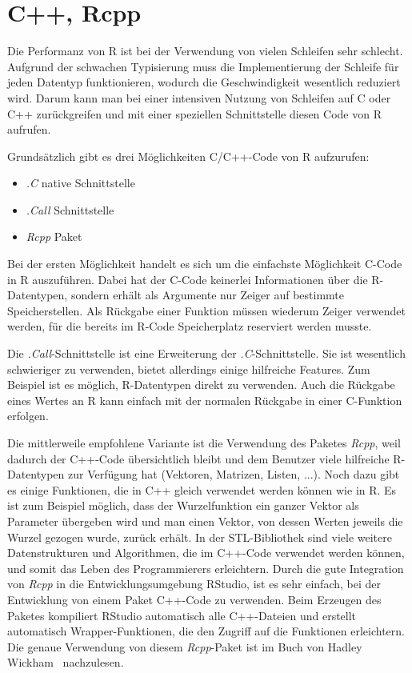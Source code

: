 \section{C++, Rcpp}
\label{sec:Rcpp}
Die Performanz von R ist bei der Verwendung von vielen Schleifen sehr schlecht. Aufgrund der schwachen Typisierung muss die Implementierung der Schleife für jeden Datentyp funktionieren, wodurch die Geschwindigkeit wesentlich reduziert wird. Darum kann man bei einer intensiven Nutzung von Schleifen auf C oder C++ zurückgreifen und mit einer speziellen Schnittstelle diesen Code von R aufrufen.

Grundsätzlich gibt es drei Möglichkeiten C/C++-Code von R aufzurufen:
\begin{itemize}
	\item \emph{.C} native Schnittstelle
	\item \emph{.Call} Schnittstelle
	\item \emph{Rcpp} Paket
\end{itemize}

Bei der ersten Möglichkeit handelt es sich um die einfachste Möglichkeit C-Code in R auszuführen. Dabei hat der C-Code keinerlei Informationen über die R-Datentypen, sondern erhält als Argumente nur Zeiger auf bestimmte Speicherstellen. Als Rückgabe einer Funktion müssen wiederum Zeiger verwendet werden, für die bereits im R-Code Speicherplatz reserviert werden musste.

Die \emph{.Call}-Schnittstelle ist eine Erweiterung der \emph{.C}-Schnittstelle. Sie ist wesentlich schwieriger zu verwenden, bietet allerdings einige hilfreiche Features. Zum Beispiel ist es möglich, R-Datentypen direkt zu verwenden. Auch die Rückgabe eines Wertes an R kann einfach mit der normalen Rückgabe in einer C-Funktion erfolgen.~\cite[171-187]{wickham2015r}

Die mittlerweile empfohlene Variante ist die Verwendung des Paketes \emph{Rcpp}, weil dadurch der C++-Code übersichtlich bleibt und dem Benutzer viele hilfreiche R-Datentypen zur Verfügung hat (Vektoren, Matrizen, Listen, ...). Noch dazu gibt es einige Funktionen, die in C++ gleich verwendet werden können wie in R. Es ist zum Beispiel möglich, dass der Wurzelfunktion ein ganzer Vektor als Parameter übergeben wird und man einen Vektor, von dessen Werten jeweils die Wurzel gezogen wurde, zurück erhält. In der STL-Bibliothek sind viele weitere Datenstrukturen und Algorithmen, die im C++-Code verwendet werden können, und somit das Leben des Programmierers erleichtern. Durch die gute Integration von \emph{Rcpp} in die Entwicklungsumgebung RStudio, ist es sehr einfach, bei der Entwicklung von einem Paket C++-Code zu verwenden. Beim Erzeugen des Paketes kompiliert RStudio automatisch alle C++-Dateien und erstellt automatisch Wrapper-Funktionen, die den Zugriff auf die Funktionen erleichtern. Die genaue Verwendung von diesem \emph{Rcpp}-Paket ist im Buch von Hadley Wickham~\cite[395-430]{wickham2015advanced} nachzulesen.

